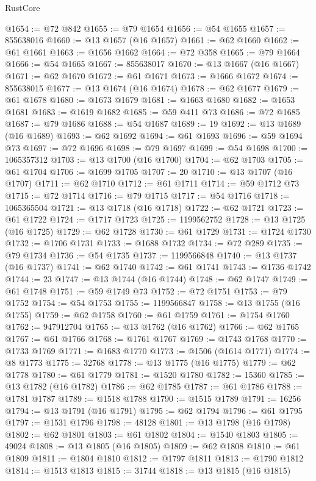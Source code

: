 \begin{lexlean}{RustCore}
\begin{coremodule}
@1654 := @72 @842
@1655 := @79 @1654
@1656 := @54 @1655
@1657 := 855638016
@1660 := @13 @1657 (@16 @1657)
@1661 := @62 @1660
@1662 := @61 @1661
@1663 := @1656 @1662
@1664 := @72 @358
@1665 := @79 @1664
@1666 := @54 @1665
@1667 := 855638017
@1670 := @13 @1667 (@16 @1667)
@1671 := @62 @1670
@1672 := @61 @1671
@1673 := @1666 @1672
@1674 := 855638015
@1677 := @13 @1674 (@16 @1674)
@1678 := @62 @1677
@1679 := @61 @1678
@1680 := @1673 @1679
@1681 := @1663 @1680
@1682 := @1653 @1681
@1683 := @1619 @1682
@1685 := @59 @411 @73
@1686 := @72 @1685
@1687 := @79 @1686
@1688 := @54 @1687
@1689 := 19
@1692 := @13 @1689 (@16 @1689)
@1693 := @62 @1692
@1694 := @61 @1693
@1696 := @59 @1694 @73
@1697 := @72 @1696
@1698 := @79 @1697
@1699 := @54 @1698
@1700 := 1065357312
@1703 := @13 @1700 (@16 @1700)
@1704 := @62 @1703
@1705 := @61 @1704
@1706 := @1699 @1705
@1707 := 20
@1710 := @13 @1707 (@16 @1707)
@1711 := @62 @1710
@1712 := @61 @1711
@1714 := @59 @1712 @73
@1715 := @72 @1714
@1716 := @79 @1715
@1717 := @54 @1716
@1718 := 1065365504
@1721 := @13 @1718 (@16 @1718)
@1722 := @62 @1721
@1723 := @61 @1722
@1724 := @1717 @1723
@1725 := 1199562752
@1728 := @13 @1725 (@16 @1725)
@1729 := @62 @1728
@1730 := @61 @1729
@1731 := @1724 @1730
@1732 := @1706 @1731
@1733 := @1688 @1732
@1734 := @72 @289
@1735 := @79 @1734
@1736 := @54 @1735
@1737 := 1199566848
@1740 := @13 @1737 (@16 @1737)
@1741 := @62 @1740
@1742 := @61 @1741
@1743 := @1736 @1742
@1744 := 23
@1747 := @13 @1744 (@16 @1744)
@1748 := @62 @1747
@1749 := @61 @1748
@1751 := @59 @1749 @73
@1752 := @72 @1751
@1753 := @79 @1752
@1754 := @54 @1753
@1755 := 1199566847
@1758 := @13 @1755 (@16 @1755)
@1759 := @62 @1758
@1760 := @61 @1759
@1761 := @1754 @1760
@1762 := 947912704
@1765 := @13 @1762 (@16 @1762)
@1766 := @62 @1765
@1767 := @61 @1766
@1768 := @1761 @1767
@1769 := @1743 @1768
@1770 := @1733 @1769
@1771 := @1683 @1770
@1773 := @1506 (@1614 @1771)
@1774 := @8 @1773
@1775 := 32768
@1778 := @13 @1775 (@16 @1775)
@1779 := @62 @1778
@1780 := @61 @1779
@1781 := @1520 @1780
@1782 := 15360
@1785 := @13 @1782 (@16 @1782)
@1786 := @62 @1785
@1787 := @61 @1786
@1788 := @1781 @1787
@1789 := @1518 @1788
@1790 := @1515 @1789
@1791 := 16256
@1794 := @13 @1791 (@16 @1791)
@1795 := @62 @1794
@1796 := @61 @1795
@1797 := @1531 @1796
@1798 := 48128
@1801 := @13 @1798 (@16 @1798)
@1802 := @62 @1801
@1803 := @61 @1802
@1804 := @1540 @1803
@1805 := 49024
@1808 := @13 @1805 (@16 @1805)
@1809 := @62 @1808
@1810 := @61 @1809
@1811 := @1804 @1810
@1812 := @1797 @1811
@1813 := @1790 @1812
@1814 := @1513 @1813
@1815 := 31744
@1818 := @13 @1815 (@16 @1815)

\end{coremodule}
\end{lexlean}
